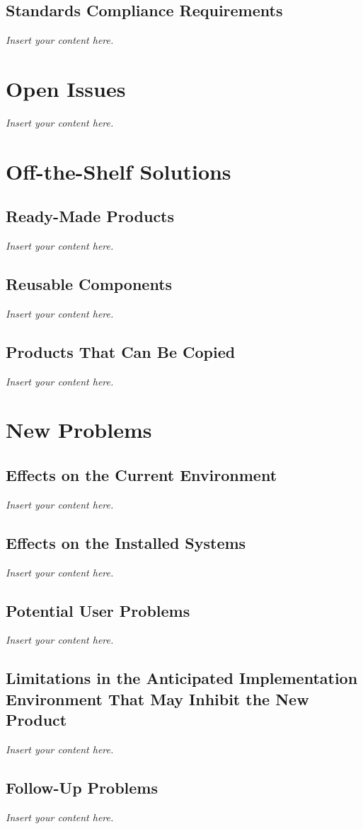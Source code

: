 \documentclass[12pt]{article}
\newcommand{\lips}{\textit{Insert your content here.}}
\begin{document}
\subsection{Standards Compliance Requirements}
\lips

\section{Open Issues}
\lips
\section{Off-the-Shelf Solutions}
\subsection{Ready-Made Products}
\lips
\subsection{Reusable Components}
\lips
\subsection{Products That Can Be Copied}
\lips

\section{New Problems}
\subsection{Effects on the Current Environment}
\lips
\subsection{Effects on the Installed Systems}
\lips
\subsection{Potential User Problems}
\lips
\subsection{Limitations in the Anticipated Implementation Environment That May
Inhibit the New Product}
\lips
\subsection{Follow-Up Problems}
\lips
\end{document}
